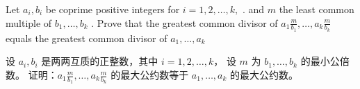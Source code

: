 \documentclass[a4paper]{article}
\begin{document}
Let $a_{i}, b_{i}$ be coprime positive integers for $i=1, 2, \ldots, k,$ .
and $m$ the least common multiple of $b_{1}, \ldots, b_{k}$ . 
Prove that the greatest common divisor of $a_{1} \frac{m} {b_{1}}, \dots, a_{k} \frac{m}{b_{k}}$ 
equals the greatest common divisor of $a_{1}, \ldots, a_{k}$

设 $a_{i}, b_{i}$ 是两两互质的正整数，其中 $i=1, 2, \ldots, k$，
设 $m$ 为 $b_{1}, \ldots, b_{k}$ 的最小公倍数。
证明：$a_{1} \frac{m}{b_{1}}, \dots, a_{k} \frac{m}{b_{k}}$ 的最大公约数等于 $a_{1}, \ldots, a_{k}$ 的最大公约数。
\end{document}
